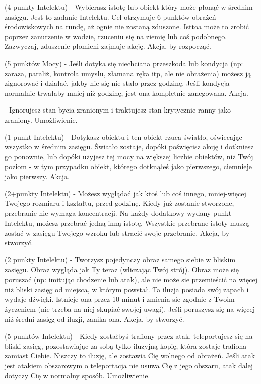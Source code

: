 { (4 punkty Intelektu) - Wybierasz istotę lub obiekt który może płonąć w średnim zasięgu. Jest to zadanie Intelektu. Cel otrzymuje 6 punktów obrażeń środowiskowych na rundę, aż ognie nie zostaną zduszone. Isttoa może to zrobić poprzez zanurzenie w wodzie, rzuceniu się na ziemię lub coś podobnego. Zazwyczaj, zduszenie płomieni zajmuje akcję. Akcja, by rozpocząć. 

  (5 punktów Mocy) - Jeśli dotyka się niechciana przeszkoda lub kondycja (np: zaraza, paraliż, kontrola umysłu, złamana ręka itp, ale nie obrażenia) możesz ją zignorować i działać, jakby nic się nie stało przez godzinę. Jeśli kondycja normalnie trwałaby mniej niż godzinę, jest ona kompletnie zanegowana. Akcja.
 
  - Ignorujesz stan bycia zranionym i traktujesz stan krytycznie ranny jako zraniony. Umożliwienie.
 
  (1 punkt Intelektu) - Dotykasz obiektu i ten obiekt rzuca światło, oświecając wszystko w średnim zasięgu. Światło zostaje, dopóki poświęcisz akcję i dotkniesz go ponownie, lub dopóki użyjesz tej mocy na większej liczbie obiektów, niż Twój poziom - w tym przypadku obiekt, którego dotknąłeś jako pierwszego, ciemnieje jako pierwszy. Akcja.
 
 (2+punkty Intelektu) - Możesz wyglądać jak ktoś lub coś innego, mniej-więcej Twojego rozmiaru i kształtu, przed godzinę. Kiedy już zostanie stworzone, przebranie nie wymaga koncentracji. Na każdy dodatkowy wydany punkt Intelektu, możesz przebrać jedną inną istotę. Wszystkie przebrane istoty muszą zostać w zasięgu Twojego wzroku lub stracić swoje przebranie. Akcja, by stworzyć. 

 (2 punkty Intelektu) - Tworzysz pojedynczy obraz samego siebie w bliskim zasięgu. Obraz wygląda jak Ty teraz (wliczając Twój strój). Obraz może się poruszać (np: imitując chodzenie lub atak), ale nie może sie przemieścić na więcej niż bliski zasięg od miejsca, w którym powstał. Ta iluzja posiada swój zapach i wydaje dźwięki. Istnieje ona przez 10 minut i zmienia sie zgodnie z Twoim życzeniem (nie trzeba na niej skupiać swojej uwagi). Jeśli poruszysz się na więcej niż średni zasięg od iluzji, zanika ona. Akcja, by stworzyć.

 (5 punktów Intelektu) - Kiedy zostałbyś trafiony przez atak, teleportujesz się na bliski zasięg, pozostawiając za sobą tylko iluzyjną kopię, która zostaje trafiona zamiast Ciebie. Niszczy to iluzję, ale zostawia Cię wolnego od obrażeń. Jeśli atak jest atakiem obszarowym o teleportacja nie usuwa Cię z jego obszaru, atak dalej dotyczy Cię w normalny sposób. Umożliwienie.

}
